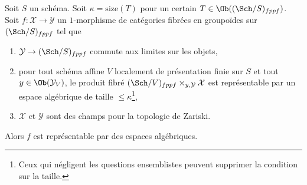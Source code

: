 \begin{lemma}
\label{lemma-check-representable-limit-preserving}
Soit $S$ un schéma.
Soit $\kappa = \text{size}(T)$ pour un certain $T \in \Ob((\Sch/S)_{fppf})$.
Soit $f : \mathcal{X} \to \mathcal{Y}$ un $1$-morphisme
de catégories fibrées en groupoïdes sur $(\Sch/S)_{fppf}$
tel que
\begin{enumerate}
\item $\mathcal{Y} \to (\Sch/S)_{fppf}$ commute aux limites sur les objets,
\item pour tout schéma affine $V$ localement de présentation finie sur $S$ et
tout $y \in \Ob(\mathcal{Y}_V)$, le produit fibré
$(\Sch/V)_{fppf} \times_{y, \mathcal{Y}} \mathcal{X}$ est représentable
par un espace algébrique de taille $\leq \kappa$\footnote{Ceux qui négligent les
questions ensemblistes peuvent supprimer la condition sur la taille.},
\item $\mathcal{X}$ et $\mathcal{Y}$ sont des champs pour la topologie de Zariski.
\end{enumerate}
Alors $f$ est représentable par des espaces algébriques.
\end{lemma}


